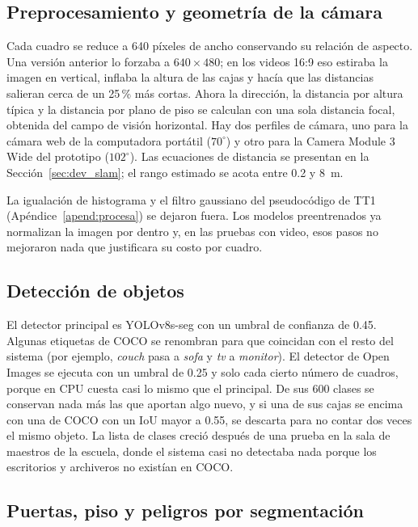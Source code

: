 \subsection{Preprocesamiento y geometría de la cámara}

Cada cuadro se reduce a 640 píxeles de ancho conservando su relación de aspecto. Una
versión anterior lo forzaba a $640 \times 480$; en los videos 16:9 eso estiraba la
imagen en vertical, inflaba la altura de las cajas y hacía que las distancias salieran
cerca de un 25\,\% más cortas. Ahora la dirección, la distancia por altura típica y la
distancia por plano de piso se calculan con una sola distancia focal, obtenida del campo
de visión horizontal. Hay dos perfiles de cámara, uno para la cámara web de la
computadora portátil ($70^\circ$) y otro para la Camera Module 3 Wide del prototipo
($102^\circ$). Las ecuaciones de distancia se presentan en la Sección~\ref{sec:dev_slam};
el rango estimado se acota entre 0.2 y 8~m.

La igualación de histograma y el filtro gaussiano del pseudocódigo de TT1
(Apéndice~\ref{apend:procesa}) se dejaron fuera. Los modelos preentrenados ya normalizan
la imagen por dentro y, en las pruebas con video, esos pasos no mejoraron nada que
justificara su costo por cuadro.

\subsection{Detección de objetos}

El detector principal es YOLOv8s-seg con un umbral de confianza de 0.45. Algunas
etiquetas de COCO se renombran para que coincidan con el resto del sistema (por ejemplo,
\emph{couch} pasa a \emph{sofa} y \emph{tv} a \emph{monitor}). El detector de Open
Images se ejecuta con un umbral de 0.25 y solo cada cierto número de cuadros, porque en
CPU cuesta casi lo mismo que el principal. De sus 600 clases se conservan nada más las
que aportan algo nuevo, y si una de sus cajas se encima con una de COCO con un IoU mayor
a 0.55, se descarta para no contar dos veces el mismo objeto. La lista de clases creció
después de una prueba en la sala de maestros de la escuela, donde el sistema casi no
detectaba nada porque los escritorios y archiveros no existían en COCO.

\subsection{Puertas, piso y peligros por segmentación}

